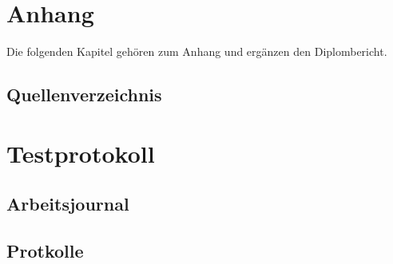 \section{Anhang}
Die folgenden Kapitel gehören zum Anhang und ergänzen den Diplombericht.


\clearpage
\renewcommand{\refname}{Literaturverzeichnis}
\subsection{Quellenverzeichnis}

\newpage


\section{Testprotokoll}


\subsection{Arbeitsjournal}
\label{app:Arbeitsjournal}


\subsection{Protkolle}
\label{app:Protokolle}




%
\clearpage


